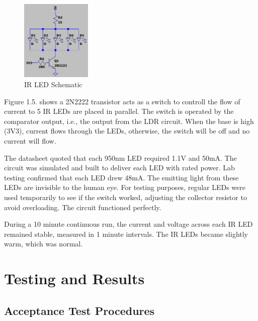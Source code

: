 \begin{figure}[h]
\centering
\includegraphics[width=0.3\textwidth]{Images/IR_LED_Array.png}
\caption{IR LED Schematic}
\label{fig:my_label}
\end{figure}

Figure 1.5. shows a 2N2222 transistor acts as a switch to controll the flow of current to 5 IR LEDs are placed in parallel. The switch is operated by the comparator output, i.e., the output from the LDR circuit. When the base is high (3V3), current flows through the LEDs, otherwise, the switch will be off and no current will flow. 

The datasheet quoted that each 950nm LED required 1.1V and 50mA. The circuit was simulated and built to deliver each LED with rated power. Lab testing confirmed that each LED drew 48mA. The emitting light from these LEDs are invisible to the human eye. For testing purposes, regular LEDs were used temporarily to see if the switch worked, adjusting the collector resistor to avoid overloading. The circuit functioned perfectly. 

During a 10 minute continuous run, the current and voltage across each IR LED remained stable, measured in 1 minute intervals. The IR LEDs became slightly warm, which was normal. 

\section{Testing and Results}
\subsection{Acceptance Test Procedures}


